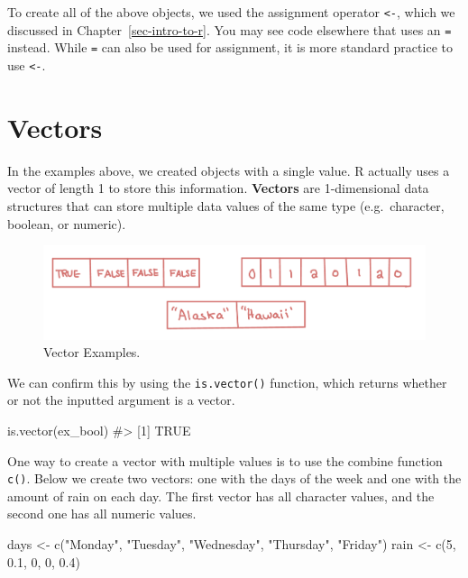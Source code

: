 \documentclass[
  letterpaper,
]{krantz}
\makeatletter
\newenvironment{Shaded}{\begin{snugshade}}{\end{snugshade}}
\newcommand{\CommentTok}[1]{\textcolor[rgb]{0.37,0.37,0.37}{#1}}
\newcommand{\DecValTok}[1]{\textcolor[rgb]{0.68,0.00,0.00}{#1}}
\newcommand{\FloatTok}[1]{\textcolor[rgb]{0.68,0.00,0.00}{#1}}
\newcommand{\FunctionTok}[1]{\textcolor[rgb]{0.28,0.35,0.67}{#1}}
\newcommand{\NormalTok}[1]{\textcolor[rgb]{0.00,0.23,0.31}{#1}}
\newcommand{\OtherTok}[1]{\textcolor[rgb]{0.00,0.23,0.31}{#1}}
\newcommand{\StringTok}[1]{\textcolor[rgb]{0.13,0.47,0.30}{#1}}
\newenvironment{kframe}{%
\medskip{}
\setlength{\fboxsep}{.8em}
 \def\at@end@of@kframe{}%
 \ifinner\ifhmode%
  \def\at@end@of@kframe{\end{minipage}}%
  \begin{minipage}{\columnwidth}%
 \fi\fi%
 \def\FrameCommand##1{\hskip\@totalleftmargin \hskip-\fboxsep
 \colorbox{shadecolor}{##1}\hskip-\fboxsep
     \hskip-\linewidth \hskip-\@totalleftmargin \hskip\columnwidth}%
 \MakeFramed {\advance\hsize-\width
   \@totalleftmargin\z@ \linewidth\hsize
   \@setminipage}}%
 {\par\unskip\endMakeFramed%
 \at@end@of@kframe}
\renewenvironment{Shaded}{\begin{kframe}}{\end{kframe}}
\makeatother
\begin{document}
To create all of the above objects, we used the assignment operator
\texttt{\textless{}-}, which we discussed in
Chapter~\ref{sec-intro-to-r}. You may see code elsewhere that uses an
\texttt{=} instead. While \texttt{=} can also be used for assignment, it
is more standard practice to use \texttt{\textless{}-}.

\hypertarget{vectors}{%
\section{Vectors}\label{vectors}}

In the examples above, we created objects with a single value. R
actually uses a vector of length 1 to store this information.
\textbf{Vectors} are 1-dimensional data structures that can store
multiple data values of the same type (e.g.~character, boolean, or
numeric).

\begin{figure}

{\centering \includegraphics{book/images/2-vectors.png}

}

\caption{\label{fig-vectors}Vector Examples.}

\end{figure}

We can confirm this by using the \texttt{is.vector()} function, which
returns whether or not the inputted argument is a vector.

\begin{Shaded}
\begin{Highlighting}[]
\FunctionTok{is.vector}\NormalTok{(ex\_bool)}
\CommentTok{\#\textgreater{} [1] TRUE}
\end{Highlighting}
\end{Shaded}

One way to create a vector with multiple values is to use the combine
function \texttt{c()}. Below we create two vectors: one with the days of
the week and one with the amount of rain on each day. The first vector
has all character values, and the second one has all numeric values.

\begin{Shaded}
\begin{Highlighting}[]
\NormalTok{days }\OtherTok{\textless{}{-}} \FunctionTok{c}\NormalTok{(}\StringTok{"Monday"}\NormalTok{, }\StringTok{"Tuesday"}\NormalTok{, }\StringTok{"Wednesday"}\NormalTok{, }\StringTok{"Thursday"}\NormalTok{, }\StringTok{"Friday"}\NormalTok{)}
\NormalTok{rain }\OtherTok{\textless{}{-}} \FunctionTok{c}\NormalTok{(}\DecValTok{5}\NormalTok{, }\FloatTok{0.1}\NormalTok{, }\DecValTok{0}\NormalTok{, }\DecValTok{0}\NormalTok{, }\FloatTok{0.4}\NormalTok{)}
\end{Highlighting}
\end{Shaded}
\end{document}
